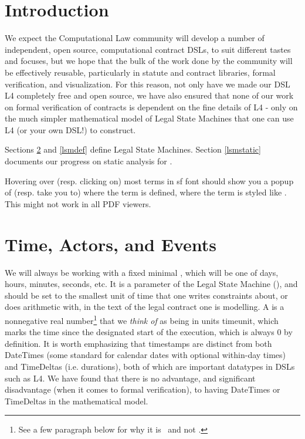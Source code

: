 \documentclass[12pt]{article}
\newcommand{\term}[1]{\EM{\textsf{\hyperref[#1]{#1}}}\xspace}
\newcommand{\termz}[2]{\EM{\textsf{\hyperref[#1]{#2}}}\xspace}
\newcommand{\lsm}{\term{LSM}}
\newcommand{\lsms}{\termz{LSM}{LSMs}}
\newcommand{\TS}{\EM{\mathbb{\hyperref[TS]{T}}}\xsapce}
\begin{document}
\tableofcontents


\section{Introduction}

We expect the Computational Law community will develop a number of independent, open source, computational contract DSLs, to suit different tastes and focuses, but we hope that the bulk of the work done by the community will be effectively reusable, particularly in statute and contract libraries, formal verification, and visualization. For this reason, not only have we made our DSL L4 completely free and open source, we have also ensured that none of our work on formal verification of contracts is dependent on the fine details of L4 - only on the much simpler mathematical model of Legal State Machines that one can use L4 (or your own DSL!) to construct.

Sections \ref{basics} and \ref{lsmdef} define Legal State Machines. Section \ref{lsmstatic} documents our progress on static analysis for \lsms.

Hovering over (resp. clicking on) most terms in \textsf{{sf font}} should show you a popup of (resp. take you to)  where the term is defined, where the term is styled like . This might not work in all PDF viewers.


\section{Time, Actors, and Events} \label{basics}
We will always be working with a fixed minimal , which will be one of days, hours, minutes, seconds, etc. It is a parameter of the Legal State Machine (\lsm), and should be set to the smallest unit of time that one writes constraints about, or does arithmetic with, in the text of the legal contract one is modelling.  A  is  a nonnegative real number\footnote{See a few paragraph below for why it is \RR\, and not \NN.} that we \textit{think of} as being in units timeunit, which marks the time since the designated start of the \lsm execution, which is always 0 by definition.
It is worth emphasizing that timestamps are distinct from both DateTimes (some standard for calendar dates with optional within-day times) and TimeDeltas (i.e. durations), both of which are important datatypes in DSLs such as L4. We have found that there is no advantage, and significant disadvantage (when it comes to formal verification), to having DateTimes or TimeDeltas in the mathematical model.
\end{document}
